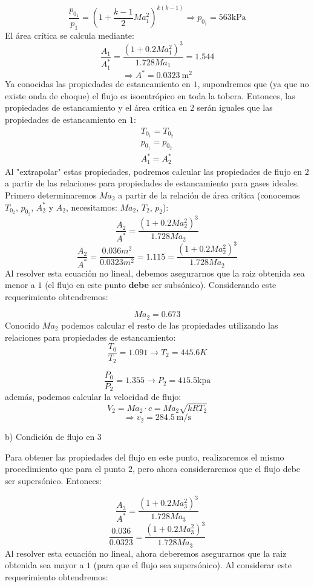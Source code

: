 \documentclass[11pt]{report}
\begin{document}
$$
\frac{p_{0_1}}{p_{1}}=\left(1+\frac{k-1}{2} Ma_1^{2}\right)^{k(k-1)} \Rightarrow p_{0_1}=563 \mathrm{kPa}
$$
El \'area cr\'itica se calcula mediante:
$$
\frac{A_{1}}{A_1^{*}}=\frac{\left(1+0.2 Ma_{1}^{2}\right)^{3}}{1.728 Ma_1}=1.544
$$
$$
\Rightarrow A^{*}=0.0323 \mathrm{~m}^{2}
$$
Ya conocidas las propiedades de estancamiento en $1$, supondremos que (ya que no existe onda de choque) el flujo es isoentr\'opico en toda la tobera. Entonces, las propiedades de estancamiento y el \'area cr\'itica en $2$ ser\'an iguales que las propiedades de estancamiento en $1$:
$$
\begin{array}{l}
T_{0_1}=T_{0_2} \\
p_{0_1}=p_{0_2} \\
A^*_1=A^*_2
\end{array}
$$
Al "extrapolar" estas propiedades, podremos calcular las propiedades de flujo en $2$ a partir de las relaciones para propiedades de estancamiento para gases ideales. Primero determinaremos $Ma_2$ a partir de la relaci\'on de \'area cr\'itica (conocemos $T_{0_2}$, $p_{0_2}$, $A^*_2$ y $A_2$, necesitamos: $Ma_2$, $T_{2}$, $p_2$):
$$
\frac{A_{2}}{A^{*}}=\frac{\left(1+0.2 M a_{2}^{2}\right)^{3}}{1.728 M a_{2}}
$$
$$
\frac{A_{2}}{A^{*}}=\frac{0.036 m^{2}}{0.0323 m^{2}}=1.115=\frac{\left(1+0.2 M a_{2}^{2}\right)^{3}}{1.728 Ma_{2}}
$$
Al resolver esta ecuaci\'on no lineal, debemos asegurarnos que la raiz obtenida sea menor a $1$ (el flujo en este punto \textbf{debe} ser subs\'onico). Considerando este requerimiento obtendremos:

$$
Ma_{2}=0.673
$$
Conocido $Ma_2$ podemos calcular el resto de las propiedades utilizando las relaciones para propiedades de estancamiento:
$$\frac{T_{0}}{T_{2}}=1.091 \rightarrow T_{2}=445.6 K$$

$$
\frac{P_{0}}{P_{2}}=1.355 \rightarrow P_{2}=415.5 \mathrm{kpa}
$$
adem\'as, podemos calcular la velocidad de flujo:
$$
V_{2}= Ma_{2} \cdot c=Ma_{2} \sqrt{k R T_{2}} 
$$
$$
 \Rightarrow v_{2}=284.5 \mathrm{~m} / \mathrm{s}
$$

b) Condici\'on de flujo en $3$

Para obtener las propiedades del flujo en este punto, realizaremos el mismo procedimiento que para el punto $2$, pero ahora consideraremos que el flujo debe ser supers\'onico. Entonces:

$$
\frac{A_{3}}{A^{*}}=\frac{\left(1+0.2 Ma_{3}^{2}\right)^{3}}{1.728 Ma_{3}}
$$
$$
\frac{0.036}{0.0323}=\frac{\left(1+0.2 {Ma}_{3}^{2}\right)^{3}}{1.728 {Ma}_{3}}
$$
Al resolver esta ecuaci\'on no lineal, ahora deberemos asegurarnos que la raiz obtenida sea mayor a $1$ (para que el flujo sea supers\'onico). Al considerar este requerimiento obtendremos:
\end{document}
